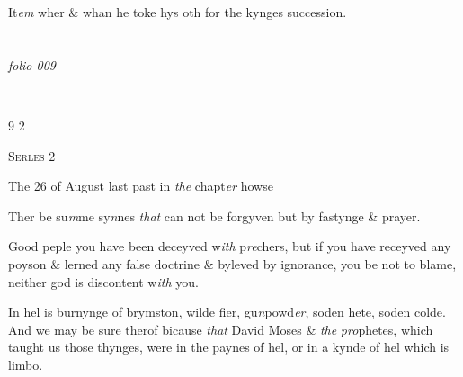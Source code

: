 \documentclass[12pt, a4paper]{book}
\begin{document}
		\ifthenelse{\isodd{\thepage}}
		{\reversemarginpar}
		{\normalmarginpar}
		It\textit{em} wher \& whan he toke hys oth for the kynges
 succession.

\dotfill
					  \section*{}

\textit{folio 009}



 \begin{flushright}{\color{Mahogany}9} 2\end{flushright}
 

               
				\begin{center} \begin{large} {\scshape Serles 2} \end{large} \end{center}
			
 
		\ifthenelse{\isodd{\thepage}}
		{\reversemarginpar}
		{\normalmarginpar}
		The 26 of August last past in \textit{the} chapt\textit{er} howse
 
				\marginpar[\vspace{0.5cm}{\textcolor{Gray}{n}}]{}
			
		\ifthenelse{\isodd{\thepage}}
		{\reversemarginpar}
		{\normalmarginpar}
		Ther be su\textit{m}me sy\textit{n}nes \textit{that} can not be forgyven but by
 fastynge \& prayer.
 
				\marginpar[\vspace{0.5cm}{\textcolor{Gray}{n}}]{}
			
		\ifthenelse{\isodd{\thepage}}
		{\reversemarginpar}
		{\normalmarginpar}
		Good peple you have been deceyved w\textit{ith} p\textit{re}chers, but
 if you have receyved any poyson \& lerned any false
 doctrine \& byleved by ignorance, you be not to blame,
 neither god is discontent w\textit{ith} you.
 
				\marginpar[\vspace{0.5cm}{\textcolor{Gray}{n}}]{}
			
		\ifthenelse{\isodd{\thepage}}
		{\reversemarginpar}
		{\normalmarginpar}
		In hel is burnynge of brymston, wilde fier, gu\textit{n}powd\textit{er},
 soden hete, soden colde. And we may be sure therof
 bicause \textit{that} David Moses \& \textit{the}
               \textit{pro}phetes, which taught
 us those thynges, were in the paynes of hel, or in
 a kynde of hel which is limbo.
	
\end{document}
